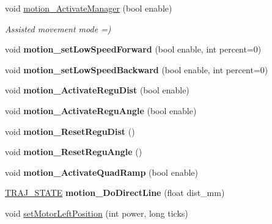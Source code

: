\begin{DoxyCompactItemize}
\mbox{\label{classAsservN_ad45f8806ed73aa5c2e304dd05c6d1557}} 
void \hyperlink{classAsservN_ad45f8806ed73aa5c2e304dd05c6d1557}{motion\+\_\+\+Activate\+Manager} (bool enable)
\begin{DoxyCompactList}\small\item\em Assisted movement mode =) \end{DoxyCompactList}\item 
\mbox{\label{classAsservN_a022af36a8d30db53a0d2b6979c56ef26}} 
void {\bfseries motion\+\_\+set\+Low\+Speed\+Forward} (bool enable, int percent=0)
\item 
\mbox{\label{classAsservN_a8bda0ad281ee8e104f5fb1ea6983c6fa}} 
void {\bfseries motion\+\_\+set\+Low\+Speed\+Backward} (bool enable, int percent=0)
\item 
\mbox{\label{classAsservN_a9714a72d31b7b5d169009c8676da4bd2}} 
void {\bfseries motion\+\_\+\+Activate\+Regu\+Dist} (bool enable)
\item 
\mbox{\label{classAsservN_a821f9baea9c97984d8e7385ebd17dd16}} 
void {\bfseries motion\+\_\+\+Activate\+Regu\+Angle} (bool enable)
\item 
\mbox{\label{classAsservN_acdc87c81febd67e14e01e820b02b53b2}} 
void {\bfseries motion\+\_\+\+Reset\+Regu\+Dist} ()
\item 
\mbox{\label{classAsservN_abe603a1ba763fe3c97a79d880cbb6ac7}} 
void {\bfseries motion\+\_\+\+Reset\+Regu\+Angle} ()
\item 
\mbox{\label{classAsservN_a10fa49ea0b153e865a1c1b4bd104853d}} 
void {\bfseries motion\+\_\+\+Activate\+Quad\+Ramp} (bool enable)
\item 
\mbox{\label{classAsservN_ab3765e49ecbbd5aa9e471ff09bc7fb78}} 
\hyperlink{path__manager_8h_adb3360abeb29758da93865c8afcb80eb}{T\+R\+A\+J\+\_\+\+S\+T\+A\+TE} {\bfseries motion\+\_\+\+Do\+Direct\+Line} (float dist\+\_\+mm)
\item 
\mbox{\label{classAsservN_a4c1cc116ac5e19d0aa64716d9720fcca}} 
void \hyperlink{classAsservN_a4c1cc116ac5e19d0aa64716d9720fcca}{set\+Motor\+Left\+Position} (int power, long ticks)

\end{DoxyCompactItemize}
